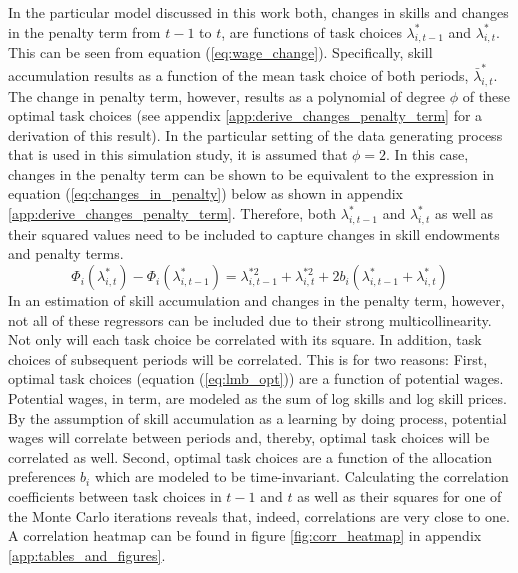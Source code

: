 \documentclass[../main.tex]{subfiles}
\begin{document}
In the particular model discussed in this work both, changes in skills and changes in the penalty term from $t-1$ to $t$, are functions of task choices $\lambda_{i,t-1}^*$ and $\lambda_{i,t}^*$. This can be seen from equation (\ref{eq:wage_change}). Specifically, skill accumulation results as a function of the mean task choice of both periods, $\bar{\lambda}_{i,t}^*$. The change in penalty term, however, results as a polynomial of degree $\phi$ of these optimal task choices (see appendix \ref{app:derive_changes_penalty_term} for a derivation of this result). In the particular setting of the data generating process that is used in this simulation study, it is assumed that $\phi = 2$. In this case, changes in the penalty term can be shown to be equivalent to the expression in equation (\ref{eq:changes_in_penalty}) below as shown in appendix \ref{app:derive_changes_penalty_term}. Therefore, both $\lambda_{i,t-1}^*$ and $\lambda_{i,t}^*$ as well as their squared values need to be included to capture changes in skill endowments and penalty terms.
\begin{equation}\label{eq:changes_in_penalty}
	\Phi_{i}(\lambda_{i,t}^*) - \Phi_{i}(\lambda_{i,t-1}^*) = \lambda_{i,t-1}^{*2} + \lambda_{i,t}^{*2} + 2b_i(\lambda_{i,t-1}^* + \lambda_{i,t}^*) 
\end{equation}
In an estimation of skill accumulation and changes in the penalty term, however, not all of these regressors can be included due to their strong multicollinearity. Not only will each task choice be correlated with its square. In addition, task choices of subsequent periods will be correlated. This is for two reasons: First, optimal task choices (equation (\ref{eq:lmb_opt})) are a function of potential wages. Potential wages, in term, are modeled as the sum of log skills and log skill prices. By the assumption of skill accumulation as a learning by doing process, potential wages will correlate between periods and, thereby, optimal task choices will be correlated as well. Second, optimal task choices are a function of the allocation preferences $b_i$ which are modeled to be time-invariant. Calculating the correlation coefficients between task choices in $t-1$ and $t$ as well as their squares for one of the Monte Carlo iterations reveals that, indeed, correlations are very close to one. A correlation heatmap can be found in figure \ref{fig:corr_heatmap} in appendix \ref{app:tables_and_figures}.
\end{document}
